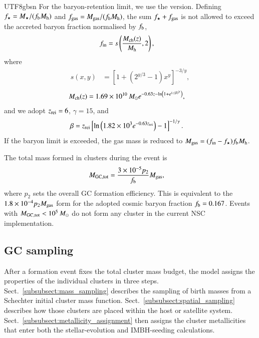 \documentclass[trackchanges, twocolappendix, twocolumn]{aastex701}
\begin{document}
\begin{CJK*}{UTF8}{gbsn}
For the baryon-retention limit, we use the \cite{Chen&Gnedin2023GC} version. Defining $f_{\star} = M_{\star} / (f_{\rm b} M_{\rm h})$ and $f_{\rm gas} = M_{\rm gas} / (f_{\rm b} M_{\rm h})$, the sum $f_{\star} + f_{\rm gas}$ is not allowed to exceed the accreted baryon fraction normalised by $f_{\rm b}$,
\begin{align}
f_{\rm in} & = s\left(\dfrac{M_{\rm ch}(z)}{M_{\rm h}}, 2\right),
\end{align}
where
\begin{align}
s(x, y) & = \left[1 + \left(2^{y / 3} - 1\right) x^y\right]^{-3 / y},
\end{align}
\begin{align}
M_{\rm ch}(z) & = 1.69 \times 10^{10}\,M_\odot
e^{-0.63 z - \ln\left(1 + e^{(z / \beta)^{\gamma}}\right)},
\end{align}
and we adopt $z_{\rm rei} = 6$, $\gamma = 15$, and
\begin{align}
\beta & = z_{\rm rei}
\left[\ln\left(1.82 \times 10^3 e^{-0.63 z_{\rm rei}}\right) - 1\right]^{-1 / \gamma}.
\end{align}
If the baryon limit is exceeded, the gas mass is reduced to $M_{\rm gas} = (f_{\rm in} - f_{\star}) f_{\rm b} M_{\rm h}$.

The total mass formed in clusters during the event is
\begin{align}
M_{\rm GC,tot} & = \dfrac{3 \times 10^{-5} p_2}{f_{\rm b}} M_{\rm gas},
\label{eq:gc_total_mass}
\end{align}
where $p_2$ sets the overall GC formation efficiency. This is equivalent to the $1.8 \times 10^{-4} p_2 M_{\rm gas}$ form for the adopted cosmic baryon fraction $f_{\rm b} = 0.167$. Events with $M_{\rm GC,tot} < 10^5\,M_\odot$ do not form any cluster in the current NSC implementation.

\subsection{GC sampling} \label{subsect:gc_sampling}

After a formation event fixes the total cluster mass budget, the model assigns the properties of the individual clusters in three steps. Sect.~\ref{subsubsect:mass_sampling} describes the sampling of birth masses from a Schechter initial cluster mass function. Sect.~\ref{subsubsect:spatial_sampling} describes how those clusters are placed within the host or satellite system. Sect.~\ref{subsubsect:metallicity_assignment} then assigns the cluster metallicities that enter both the stellar-evolution and IMBH-seeding calculations.


\end{CJK*}
\end{document}
